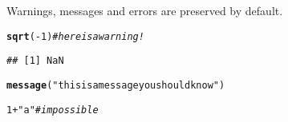 \documentclass{article}\usepackage[]{graphicx}\usepackage[]{xcolor}
\makeatletter
\newcommand{\hlnum}[1]{\textcolor[rgb]{0.686,0.059,0.569}{#1}}%
\newcommand{\hlstr}[1]{\textcolor[rgb]{0.192,0.494,0.8}{#1}}%
\newcommand{\hlcom}[1]{\textcolor[rgb]{0.678,0.584,0.686}{\textit{#1}}}%
\newcommand{\hlopt}[1]{\textcolor[rgb]{0,0,0}{#1}}%
\newcommand{\hlstd}[1]{\textcolor[rgb]{0.345,0.345,0.345}{#1}}%
\newcommand{\hlkwd}[1]{\textcolor[rgb]{0.737,0.353,0.396}{\textbf{#1}}}%
\newenvironment{kframe}{%
 \def\at@end@of@kframe{}%
 \ifinner\ifhmode%
  \def\at@end@of@kframe{\end{minipage}}%
  \begin{minipage}{\columnwidth}%
 \fi\fi%
 \def\FrameCommand##1{\hskip\@totalleftmargin \hskip-\fboxsep
 \colorbox{shadecolor}{##1}\hskip-\fboxsep
     \hskip-\linewidth \hskip-\@totalleftmargin \hskip\columnwidth}%
 \MakeFramed {\advance\hsize-\width
   \@totalleftmargin\z@ \linewidth\hsize
   \@setminipage}}%
 {\par\unskip\endMakeFramed%
 \at@end@of@kframe}
\newenvironment{knitrout}{}{} %
\makeatother
\begin{document}
Warnings, messages and errors are preserved by default.

\begin{knitrout}
\color{fgcolor}\begin{kframe}
\begin{alltt}
\hlkwd{sqrt}\hlstd{(}\hlopt{-}\hlnum{1}\hlstd{)}  \hlcom{# here is a warning!}
\end{alltt}


{\ttfamily\noindent\color{warningcolor}{\#\# Warning in sqrt(-1): NaNs produced}}\begin{verbatim}
## [1] NaN
\end{verbatim}
\begin{alltt}
\hlkwd{message}\hlstd{(}\hlstr{"this is a message you should know"}\hlstd{)}
\end{alltt}


{\ttfamily\noindent\itshape\color{messagecolor}{\#\# this is a message you should know}}\begin{alltt}
\hlnum{1} \hlopt{+} \hlstr{"a"}  \hlcom{# impossible}
\end{alltt}


{\ttfamily\noindent\bfseries{}}\end{kframe}
\end{knitrout}
\end{document}
